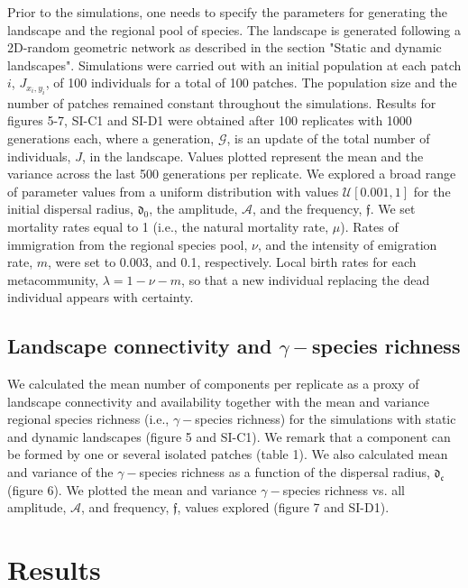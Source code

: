 \documentclass[12pt]{article}
\begin{document}
Prior to the simulations, one needs to specify the parameters for generating the landscape and the regional pool of species. The landscape is generated following a 2D-random geometric network as described in the section "Static and dynamic landscapes". Simulations were carried out with an initial population at each patch $i$, $J_{x_i,y_i}$, of 100 individuals for a total of 100 patches. The population size and the number of patches remained constant throughout the simulations. Results for figures 5-7, SI-C1 and SI-D1 were obtained after 100 replicates with 1000 generations each, where a generation, $\mathcal{G}$, is an update of the total number of individuals, $J$, in the landscape. Values plotted represent the mean and the variance across the last 500 generations per replicate. We explored a broad range of parameter values from a uniform distribution with values $\mathcal{U}[0.001,1]$ for the initial dispersal radius, $\mathfrak{d_{0}}$, the amplitude, $\mathcal{A}$, and the frequency, $\mathfrak{f}$. We set mortality rates equal to 1 (i.e., the natural mortality rate, $\mu$). Rates of immigration from the regional species pool, $\nu$, and the intensity of emigration rate, $m$, were set to 0.003, and 0.1, respectively. Local birth rates for each metacommunity, $\lambda = 1 - \nu - m$, so that a new individual replacing the dead individual appears with certainty.

\subsection*{Landscape connectivity and $\gamma-$species richness}

We calculated the mean number of components per replicate as a proxy of landscape connectivity and availability together with the mean and variance regional species richness (i.e., $\gamma-$species richness) for the simulations with static and dynamic landscapes (figure 5 and SI-C1). We remark that a component can be formed by one or several isolated patches (table 1). We also calculated mean and variance of the $\gamma-$species richness as a function of the dispersal radius, $\mathfrak{d_{c}}$ (figure 6). We plotted the mean and variance $\gamma-$species richness vs. all amplitude, $\mathcal{A}$, and frequency, $\mathfrak{f}$, values explored (figure 7 and SI-D1). 

\section*{Results}
\end{document}
